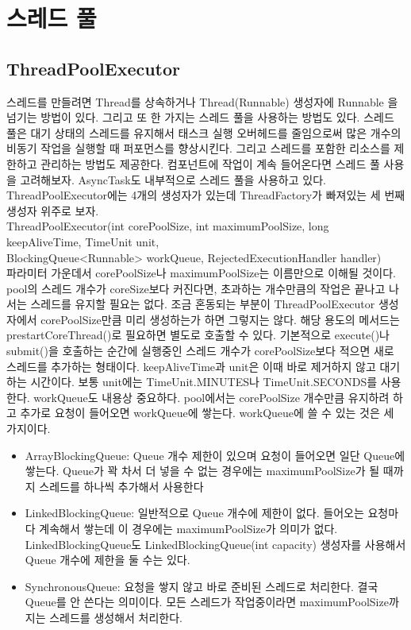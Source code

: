 \section{스레드 풀}
\subsection{ThreadPoolExecutor}
스레드를 만들려면 Thread를 상속하거나 Thread(Runnable) 생성자에 Runnable 을 넘기는 방법이 있다. 그리고 또 한 가지는 스레드 풀을 사용하는 방법도 있다.
스레드 풀은 대기 상태의 스레드를 유지해서 태스크 실행 오버헤드를 줄임으로써 많은 개수의 비동기 작업을 실행할 때 퍼포먼스를 향상시킨다. 
그리고 스레드를 포함한 리소스를 제한하고 관리하는 방법도 제공한다. 
컴포넌트에 작업이 계속 들어온다면 스레드 풀 사용을 고려해보자. AsyncTask도 내부적으로 스레드 풀을 사용하고 있다.\\

ThreadPoolExecutor에는 4개의 생성자가 있는데 ThreadFactory가 빠져있는 세 번째 생성자 위주로 보자.\\

ThreadPoolExecutor(int corePoolSize, int maximumPoolSize, long keepAliveTime, TimeUnit unit,\\ BlockingQueue<Runnable> workQueue, RejectedExecutionHandler handler)\\

파라미터 가운데서 corePoolSize나 maximumPoolSize는 이름만으로 이해될 것이다. 
pool의 스레드 개수가 coreSize보다 커진다면, 초과하는 개수만큼의 작업은 끝나고 나서는 스레드를 유지할 필요는 없다. 
조금 혼동되는 부분이 ThreadPoolExecutor 생성자에서 corePoolSize만큼 미리 생성하는가 하면 그렇지는 않다. 해당 용도의 메서드는 prestartCoreThread()로 필요하면 별도로 호출할 수 있다. 기본적으로 execute()나 submit()을 호출하는 순간에 실행중인 스레드 개수가 corePoolSize보다 적으면 새로 스레드를 추가하는 형태이다.
keepAliveTime과 unit은 이때 바로 제거하지 않고 대기하는 시간이다. 보통 unit에는 TimeUnit.MINUTES나 TimeUnit.SECONDS를 사용한다.
workQueue도 내용상 중요하다. pool에서는 corePoolSize 개수만큼 유지하려 하고 추가로 요청이 들어오면 workQueue에 쌓는다. 
workQueue에 쓸 수 있는 것은 세 가지이다.
\begin{itemize}
\item ArrayBlockingQueue: Queue 개수 제한이 있으며 요청이 들어오면 일단 Queue에 쌓는다. Queue가 꽉 차서 더 넣을 수 없는 경우에는 maximumPoolSize가 될 때까지 스레드를 하나씩 추가해서 사용한다
\item LinkedBlockingQueue: 일반적으로 Queue 개수에 제한이 없다. 들어오는 요청마다 계속해서 쌓는데 이 경우에는 maximumPoolSize가 의미가 없다. LinkedBlockingQueue도 LinkedBlockingQueue(int capacity) 생성자를 사용해서 Queue 개수에 제한을 둘 수는 있다.
\item SynchronousQueue: 요청을 쌓지 않고 바로 준비된 스레드로 처리한다. 결국 Queue를 안 쓴다는 의미이다.
모든 스레드가 작업중이라면 maximumPoolSize까지는 스레드를 생성해서 처리한다. 
\end{itemize}

